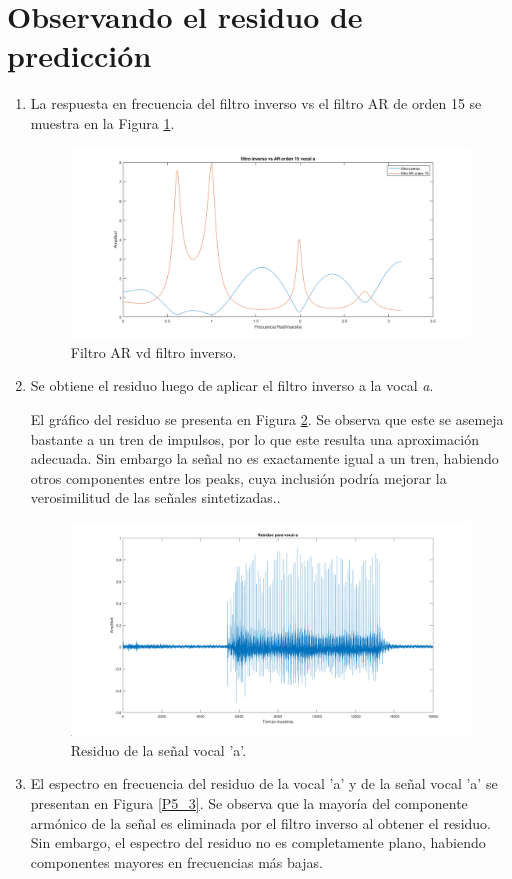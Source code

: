 \documentclass[letterpaper,onecolumn,10pt,journal,final]{IEEEtran}
\begin{document}
\section{Observando el residuo de predicción}
\begin{enumerate}[1)]
\item %
%
La respuesta en frecuencia del filtro inverso vs el filtro AR de orden 15 se muestra en la Figura \ref{P5_1}.
%
\begin{figure}[H]
    \centering
    \includegraphics[width = 0.9 \linewidth]{Figuras/P5_1.png}
    \caption{Filtro AR vd filtro inverso.}
    \label{P5_1}
\end{figure}
%
\item %
%
Se obtiene el residuo luego de aplicar el filtro inverso a la vocal \textit{a}.

El gráfico del residuo se presenta en Figura \ref{P5_2}. Se observa que este se asemeja bastante a un tren de impulsos, por lo que este resulta una aproximación adecuada. Sin embargo la señal no es exactamente igual a un tren, habiendo otros componentes entre los peaks, cuya inclusión podría mejorar la verosimilitud de las señales sintetizadas..
%
\begin{figure}[H]
    \centering
    \includegraphics[width = 0.9 \linewidth]{Figuras/P5_2.png}
    \caption{Residuo de la señal vocal 'a'.}
    \label{P5_2}
\end{figure}
%
\item %
%
El espectro en frecuencia del residuo de la vocal 'a' y de la señal vocal 'a' se presentan en Figura \ref{P5_3}. Se observa que la mayoría del componente armónico de la señal es eliminada por el filtro inverso al obtener el residuo. Sin embargo, el espectro del residuo no es completamente plano, habiendo componentes mayores en frecuencias más bajas.


\end{enumerate}
\end{document}
